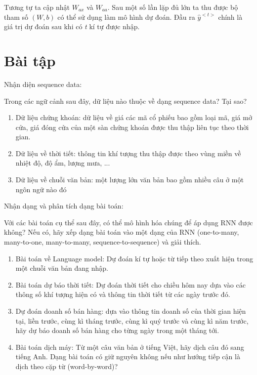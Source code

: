 Tương tự ta cập nhật $W_{ax}$ và $W_{aa}$. Sau một số lần lặp đủ lớn ta thu được bộ tham số $(W, b)$ có thể sử dụng làm mô hình dự đoán. Đầu ra $\widehat{y}^{<t>}$ chính là giá trị dự đoán sau khi có \textit{t} kí tự được nhập.

\newpage
\section{Bài tập}
\begin{exer}
Nhận diện sequence data:

Trong các ngữ cảnh sau đây, dữ liệu nào thuộc về dạng sequence data? Tại sao?
    \begin{enumerate}[label=\alph*)]
    \item Dữ liệu chứng khoán: dữ liệu về giá các mã cổ phiếu bao gồm loại mã, giá mở cửa, giá đóng cửa của một sàn chứng khoán được thu thập liên tục theo thời gian.
    \item Dữ liệu về thời tiết: thông tin khí tượng thu thập được theo vùng miền về nhiệt độ, độ ẩm, lượng mưa, ...
    \item Dữ liệu về chuỗi văn bản: một lượng lớn văn bản bao gồm nhiều câu ở một ngôn ngữ nào đó
    \end{enumerate}
\end{exer}

\begin{exer}
Nhận dạng và phân tích dạng bài toán:

Với các bài toán cụ thể sau đây, có thể mô hình hóa chúng để áp dụng RNN được không? Nếu có, hãy xếp dạng bài toán vào một dạng của RNN (one-to-many, many-to-one, many-to-many, sequence-to-sequence) và giải thích.
    \begin{enumerate}[label=\alph*)]
    \item Bài toán về Language model: Dự đoán kí tự hoặc từ tiếp theo xuất hiện trong một chuỗi văn bản đang nhập.
    \item Bài toán dự báo thời tiết: Dự đoán thời tiết cho chiều hôm nay dựa vào các thông số khí tượng hiện có và thông tin thời tiết từ các ngày trước đó.
    \item Dự đoán doanh số bán hàng: dựa vào thông tin doanh số của thời gian hiện tại, liền trước, cùng kì tháng trước, cùng kì quý trước và cùng kì năm trước, hãy dự báo doanh số bán hàng cho từng ngày trong một tháng tới.
    \item Bài toán dịch máy: Từ một câu văn bản ở tiếng Việt, hãy dịch câu đó sang tiếng Anh. Dạng bài toán có giữ nguyên không nếu như hướng tiếp cận là dịch theo cặp từ (word-by-word)?
    \end{enumerate}
\end{exer}

